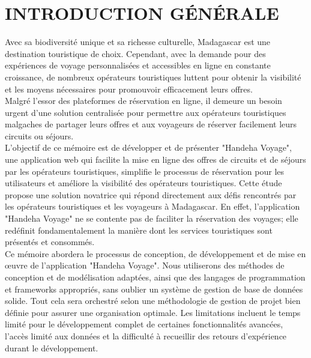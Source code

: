 \documentclass[12pt]{report}
\begin{document}
			\chapter*{INTRODUCTION GÉNÉRALE}
			\begin{center}
				\begin{minipage}{\textwidth}
					\hspace{15pt} Avec sa biodiversité unique et sa richesse culturelle, Madagascar est une destination touristique de choix. Cependant, avec la demande pour des expériences de voyage personnalisées et accessibles en ligne en constante croissance, de nombreux opérateurs touristiques luttent pour obtenir la visibilité et les moyens nécessaires pour promouvoir efficacement leurs offres.\\
	
					\hspace{15pt} Malgré l'essor des plateformes de réservation en ligne, il demeure un besoin urgent d'une solution centralisée pour permettre aux opérateurs touristiques malgaches de partager leurs offres et aux voyageurs de réserver facilement leurs circuits ou séjours.\\
	
					\hspace{15pt} L'objectif de ce mémoire est de développer et de présenter "Handeha Voyage", une application web qui  facilite la mise en ligne des offres de circuits et de séjours par les opérateurs touristiques, simplifie le processus de réservation pour les utilisateurs et améliore la visibilité des opérateurs touristiques. Cette étude propose une solution novatrice qui répond directement aux défis rencontrés par les opérateurs touristiques et les voyageurs à Madagascar. En effet, l'application "Handeha Voyage" ne se contente pas de faciliter la réservation des voyages; elle redéfinit fondamentalement la manière dont les services touristiques sont présentés et consommés.\\
	
					\hspace{15pt} Ce mémoire abordera le processus de conception, de développement et de mise en œuvre de l'application "Handeha Voyage". Nous utiliserons des méthodes de conception et de modélisation adaptées, ainsi que des langages de programmation et frameworks appropriés, sans oublier un système de gestion de base de données solide. Tout cela sera orchestré selon une méthodologie de gestion de projet bien définie pour assurer une organisation optimale. Les limitations incluent le temps limité pour le développement complet de certaines fonctionnalités avancées, l'accès limité aux données et la difficulté à recueillir des retours d'expérience durant le développement.\\
	

\end{minipage}
\end{center}
\end{document}
